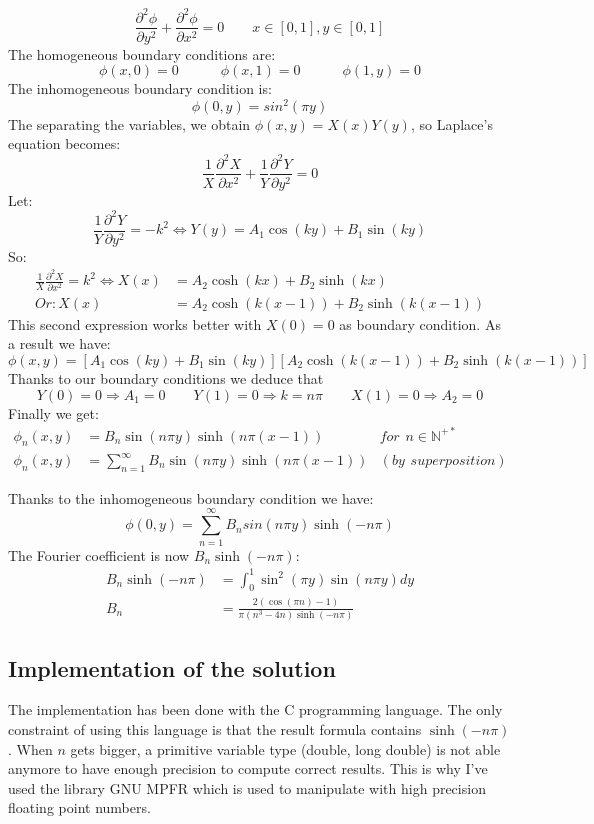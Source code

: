 \documentclass[a4paper,11pt]{article}
\begin{document}
$$\frac{\partial^2 \phi}{\partial y^2} + \frac{\partial^2 \phi}{\partial x^2} = 0 \hspace{2em} x \in [0,1], y \in [0,1]$$
The homogeneous boundary conditions are: 
$$\phi(x,0) = 0 \hspace{3em} \phi(x,1) = 0 \hspace{3em} \phi(1,y) = 0$$
The inhomogeneous boundary condition is: $$\phi(0,y) = sin^2(\pi y)$$
The separating the variables, we obtain $\phi(x,y) = X(x)Y(y)$, so Laplace's equation becomes:
$$\frac{1}{X}\frac{\partial^2 X}{\partial x^2} + \frac{1}{Y}\frac{\partial^2 Y}{\partial y^2} = 0$$
Let: $$\frac{1}{Y}\frac{\partial^2 Y}{\partial y^2} = - k^2 \Leftrightarrow Y(y) = A_1\cos(k y) + B_1\sin(k y)$$ 
So:
\begin{align*}
  \frac{1}{X}\frac{\partial^2 X}{\partial x^2} = k^2 \Leftrightarrow X(x) & = A_2\cosh(k x) + B_2\sinh(k x) \\
  Or: X(x) & = A_2\cosh(k (x-1)) + B_2\sinh(k (x-1))
\end{align*}
This second expression works better with $X(0) = 0$ as boundary condition. As a result we have:
$$\phi(x,y) = [ A_1\cos(k y) + B_1\sin(k y)][A_2\cosh(k (x-1)) + B_2\sinh(k (x-1))]$$
Thanks to our boundary conditions we deduce that
$$Y(0) = 0 \Rightarrow A_1=0 \hspace{2em} Y(1) = 0 \Rightarrow k=n \pi \hspace{2em} X(1) = 0 \Rightarrow A_2 = 0$$
Finally we get:
\begin{align*}
  \phi_n(x,y) & = B_n \sin(n \pi y)\sinh(n \pi (x-1)) & for\hspace{5pt}n \in \mathbb{N}^{+*} \\
  \phi_n(x,y) & = \sum_{n = 1}^{\infty}{B_n \sin(n \pi y)\sinh(n \pi (x-1))} & (by\hspace{5pt}superposition)
\end{align*}

Thanks to the inhomogeneous boundary condition we have:
\[
  \phi(0, y) = \sum_{n = 1}^{\infty}{B_n sin(n \pi y)\sinh(-n \pi)}
\]
The Fourier coefficient is now $B_n \sinh(-n \pi)$:
\begin{align*}
  B_n \sinh(-n \pi) & = \int_{0}^{1}{\sin^2(\pi y)\sin(n \pi y)dy} \\
  B_n & = \frac{2(\cos(\pi n) - 1)}{\pi(n^3 - 4n)\sinh(-n \pi)}
\end{align*}

\subsection{Implementation of the solution}
  The implementation has been done with the C programming language. The only constraint of using this language is
  that the result formula contains $\sinh(-n \pi)$. When $n$ gets bigger, a primitive variable type (double, long double)
  is not able anymore to have enough precision to compute correct results. This is why I've used the library
  GNU MPFR which is used to manipulate with high precision floating point numbers.
  
\end{document}
